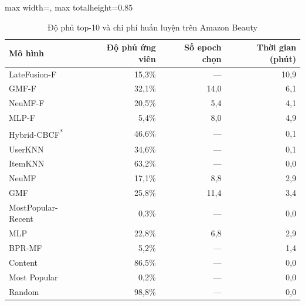 \begin{table}[H]
    \centering\small
    \caption{Độ phủ top-10 và chi phí huấn luyện trên Amazon Beauty}
    \label{tab:amzbeyond}
    \begin{adjustbox}{max width=\textwidth, max totalheight=0.85\textheight}
    \begin{tabular}{|l|r|r|r|}
        \hline
        Mô hình & Độ phủ ứng viên & Số epoch chọn & Thời gian (phút) \\ \hline
        LateFusion-F & 15{,}3\% & --- & 10{,}9 \\ \hline
        GMF-F & 32{,}1\% & 14{,}0 & 6{,}1 \\ \hline
        NeuMF-F & 20{,}5\% & 5{,}4 & 4{,}1 \\ \hline
        MLP-F & 5{,}4\% & 8{,}0 & 4{,}9 \\ \hline
        Hybrid-CBCF\textsuperscript{*} & 46{,}6\% & --- & 0{,}1 \\ \hline
        UserKNN & 34{,}6\% & --- & 0{,}1 \\ \hline
        ItemKNN & 63{,}2\% & --- & 0{,}0 \\ \hline
        NeuMF & 17{,}1\% & 8{,}8 & 2{,}9 \\ \hline
        GMF & 25{,}8\% & 11{,}4 & 3{,}4 \\ \hline
        MostPopular-Recent & 0{,}3\% & --- & 0{,}0 \\ \hline
        MLP & 22{,}8\% & 6{,}8 & 2{,}9 \\ \hline
        BPR-MF & 5{,}2\% & --- & 1{,}4 \\ \hline
        Content & 86{,}5\% & --- & 0{,}0 \\ \hline
        Most Popular & 0{,}2\% & --- & 0{,}0 \\ \hline
        Random & 98{,}8\% & --- & 0{,}0 \\ \hline
    \end{tabular}
    \end{adjustbox}
\end{table}

